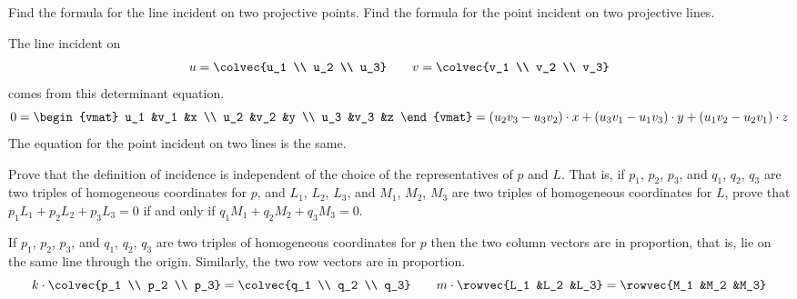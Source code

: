 \begin{exercises}
\begin{answer}
    \end{answer}
  \item
    Find the formula for the line incident on two projective points.
    Find the formula for the point incident on two projective lines.
    \begin{answer}
      The line incident on 
      \begin{equation*}
        u=\colvec{u_1 \\ u_2 \\ u_3}
        \qquad
        v=\colvec{v_1 \\ v_2 \\ v_3}
      \end{equation*}
      comes from this determinant equation.
      \begin{equation*}
        0=\begin{vmat}
          u_1  &v_1  &x  \\
          u_2  &v_2  &y  \\
          u_3  &v_3  &z
        \end{vmat}
        =(u_2v_3-u_3v_2)\cdot x 
          + (u_3v_1-u_1v_3)\cdot y 
          + (u_1v_2-u_2v_1)\cdot z
      \end{equation*}
      The equation for the point incident on two lines is the same. 
    \end{answer}
  \item \label{exer:IncidentIndReps}
    Prove that the definition of incidence is independent of the choice of 
    the representatives of $p$ and $L$.
    That is, if $p_1$, $p_2$, $p_3$, and $q_1$, $q_2$, $q_3$ are two triples of
    homogeneous coordinates for $p$, and 
    $L_1$, $L_2$, $L_3$, and $M_1$, $M_2$, $M_3$ are two triples of 
    homogeneous coordinates for $L$, prove that  
    $p_1L_1+p_2L_2+p_3L_3=0$ if and only if 
    $q_1M_1+q_2M_2+q_3M_3=0$. 
    \begin{answer}
      If $p_1$, $p_2$, $p_3$, and $q_1$, $q_2$, $q_3$ are two triples of
      homogeneous coordinates for $p$ then the two column vectors
      are in proportion, that is, lie on the same line through the
      origin.
      Similarly, the two row vectors are in proportion.
      \begin{equation*}
        k\cdot\colvec{p_1 \\ p_2 \\ p_3}
          =\colvec{q_1 \\ q_2 \\ q_3}
        \qquad
        m\cdot\rowvec{L_1 &L_2 &L_3}
          =\rowvec{M_1 &M_2 &M_3}

\end{equation*}
\end{answer}
\end{exercises}
